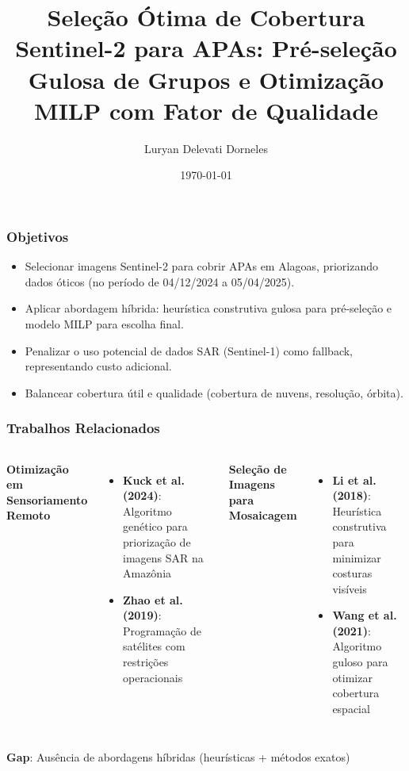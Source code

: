 \documentclass{beamer}
\title{Seleção Ótima de Cobertura Sentinel-2 para APAs: Pré-seleção Gulosa de Grupos e Otimização MILP com Fator de Qualidade}
\author{Luryan Delevati Dorneles}
\date{\today}
\begin{document}
\frame{\titlepage}

\begin{frame}
    \frametitle{Objetivos}
    \begin{itemize}
        \item Selecionar imagens Sentinel-2 para cobrir APAs em Alagoas, priorizando dados óticos (no período de 04/12/2024 a 05/04/2025).
        \item Aplicar abordagem híbrida: heurística construtiva gulosa para pré-seleção e modelo MILP para escolha final.
        \item Penalizar o uso potencial de dados SAR (Sentinel-1) como fallback, representando custo adicional.
        \item Balancear cobertura útil e qualidade (cobertura de nuvens, resolução, órbita).
    \end{itemize}
\end{frame}

\begin{frame}
    \frametitle{Trabalhos Relacionados}
    \begin{columns}
        \textbf{Otimização em Sensoriamento Remoto}
        \begin{itemize}
            \item \textbf{Kuck et al. (2024)}: Algoritmo genético para priorização de imagens SAR na Amazônia
            \item \textbf{Zhao et al. (2019)}: Programação de satélites com restrições operacionais
        \end{itemize}
        
        \textbf{Seleção de Imagens para Mosaicagem}
        \begin{itemize}
            \item \textbf{Li et al. (2018)}: Heurística construtiva para minimizar costuras visíveis
            \item \textbf{Wang et al. (2021)}: Algoritmo guloso para otimizar cobertura espacial
        \end{itemize}
    \end{columns}
    
    \vspace{0.5cm}
    \centering
    \textbf{Gap}: Ausência de abordagens híbridas (heurísticas + métodos exatos)
\end{frame}
\end{document}
